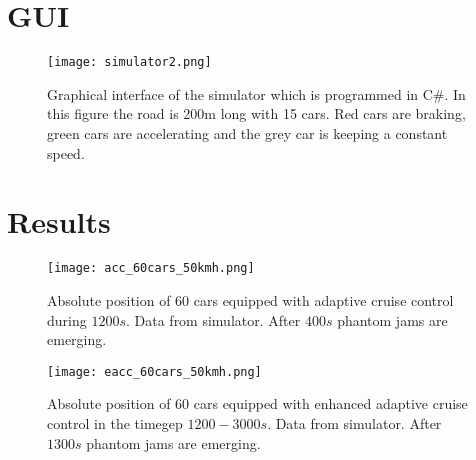 \section{GUI}
\label{gui}

\begin{figure}[h!]
    \begin{center}
    \texttt{[image: simulator2.png]}
    \caption{Graphical interface of the simulator which is programmed in C#. In this figure the road is 200m long with 15 cars. Red cars are braking, green cars are accelerating and the grey car is keeping a constant speed.}
    \end{center}
\end{figure}

\section{Results}
\label{app_postime_plot}
\begin{figure}[h!]
    \begin{center}
    \texttt{[image: acc\_60cars\_50kmh.png]}
    \caption{\label{acc_postime}
Absolute position of 60 cars equipped with adaptive cruise control during $ 1200 \unit{s} $. Data from simulator. After $ 400 \unit{s} $ phantom jams are emerging.}
    \end{center}
\end{figure}

\begin{figure}[h!]
    \begin{center}
    \texttt{[image: eacc\_60cars\_50kmh.png]}
    \caption{\label{eacc_postime}
Absolute position of 60 cars equipped with enhanced adaptive cruise control in the timegep $ 1200 - 3000 \unit{s} $. Data from simulator. After $ 1300 \unit{s} $ phantom jams are emerging.}
    \end{center}
\end{figure}